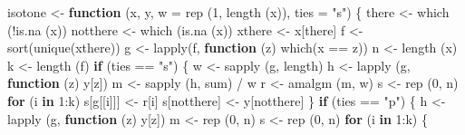 \documentclass[
  12pt,
]{book}
\newenvironment{Shaded}{\begin{snugshade}}{\end{snugshade}}
\newcommand{\AttributeTok}[1]{\textcolor[rgb]{0.77,0.63,0.00}{#1}}
\newcommand{\ControlFlowTok}[1]{\textcolor[rgb]{0.13,0.29,0.53}{\textbf{#1}}}
\newcommand{\DecValTok}[1]{\textcolor[rgb]{0.00,0.00,0.81}{#1}}
\newcommand{\FunctionTok}[1]{\textcolor[rgb]{0.00,0.00,0.00}{#1}}
\newcommand{\NormalTok}[1]{#1}
\newcommand{\OtherTok}[1]{\textcolor[rgb]{0.56,0.35,0.01}{#1}}
\newcommand{\SpecialCharTok}[1]{\textcolor[rgb]{0.00,0.00,0.00}{#1}}
\newcommand{\StringTok}[1]{\textcolor[rgb]{0.31,0.60,0.02}{#1}}
\begin{document}
\begin{Shaded}
\begin{Highlighting}[]
\NormalTok{isotone }\OtherTok{\textless{}{-}}
  \ControlFlowTok{function}\NormalTok{ (x,}
\NormalTok{            y,}
            \AttributeTok{w =} \FunctionTok{rep}\NormalTok{ (}\DecValTok{1}\NormalTok{, }\FunctionTok{length}\NormalTok{ (x)),}
            \AttributeTok{ties =} \StringTok{"s"}\NormalTok{) \{}
\NormalTok{    there }\OtherTok{\textless{}{-}} \FunctionTok{which}\NormalTok{ (}\SpecialCharTok{!}\FunctionTok{is.na}\NormalTok{ (x))}
\NormalTok{    notthere }\OtherTok{\textless{}{-}} \FunctionTok{which}\NormalTok{ (}\FunctionTok{is.na}\NormalTok{ (x))}
\NormalTok{    xthere }\OtherTok{\textless{}{-}}\NormalTok{ x[there]}
\NormalTok{    f }\OtherTok{\textless{}{-}} \FunctionTok{sort}\NormalTok{(}\FunctionTok{unique}\NormalTok{(xthere))}
\NormalTok{    g }\OtherTok{\textless{}{-}} \FunctionTok{lapply}\NormalTok{(f, }\ControlFlowTok{function}\NormalTok{ (z)}
      \FunctionTok{which}\NormalTok{(x }\SpecialCharTok{==}\NormalTok{ z))}
\NormalTok{    n }\OtherTok{\textless{}{-}} \FunctionTok{length}\NormalTok{ (x)}
\NormalTok{    k }\OtherTok{\textless{}{-}} \FunctionTok{length}\NormalTok{ (f)}
    \ControlFlowTok{if}\NormalTok{ (ties }\SpecialCharTok{==} \StringTok{"s"}\NormalTok{) \{}
\NormalTok{      w }\OtherTok{\textless{}{-}} \FunctionTok{sapply}\NormalTok{ (g, length)}
\NormalTok{      h }\OtherTok{\textless{}{-}} \FunctionTok{lapply}\NormalTok{ (g, }\ControlFlowTok{function}\NormalTok{ (z)}
\NormalTok{        y[z])}
\NormalTok{      m }\OtherTok{\textless{}{-}} \FunctionTok{sapply}\NormalTok{ (h, sum) }\SpecialCharTok{/}\NormalTok{ w}
\NormalTok{      r }\OtherTok{\textless{}{-}} \FunctionTok{amalgm}\NormalTok{ (m, w)}
\NormalTok{      s }\OtherTok{\textless{}{-}} \FunctionTok{rep}\NormalTok{ (}\DecValTok{0}\NormalTok{, n)}
      \ControlFlowTok{for}\NormalTok{ (i }\ControlFlowTok{in} \DecValTok{1}\SpecialCharTok{:}\NormalTok{k)}
\NormalTok{        s[g[[i]]] }\OtherTok{\textless{}{-}}\NormalTok{ r[i]}
\NormalTok{    s[notthere] }\OtherTok{\textless{}{-}}\NormalTok{ y[notthere]}
\NormalTok{    \}}
    \ControlFlowTok{if}\NormalTok{ (ties }\SpecialCharTok{==} \StringTok{"p"}\NormalTok{) \{}
\NormalTok{      h }\OtherTok{\textless{}{-}} \FunctionTok{lapply}\NormalTok{ (g, }\ControlFlowTok{function}\NormalTok{ (z)}
\NormalTok{        y[z])}
\NormalTok{      m }\OtherTok{\textless{}{-}} \FunctionTok{rep}\NormalTok{ (}\DecValTok{0}\NormalTok{, n)}
\NormalTok{      s }\OtherTok{\textless{}{-}} \FunctionTok{rep}\NormalTok{ (}\DecValTok{0}\NormalTok{, n)}
      \ControlFlowTok{for}\NormalTok{ (i }\ControlFlowTok{in} \DecValTok{1}\SpecialCharTok{:}\NormalTok{k) \{}

\end{Highlighting}
\end{Shaded}
\end{document}
